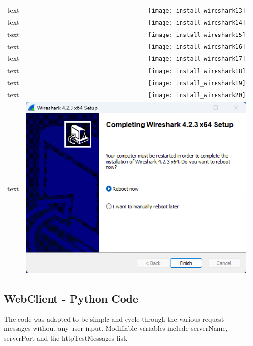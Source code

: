\documentclass[11pt,a4paper]{report}
\begin{document}
\begin{tabular}{ l r }
            text & \texttt{[image: install\_wireshark13]} \\
            text & \texttt{[image: install\_wireshark14]} \\
            text & \texttt{[image: install\_wireshark15]} \\
            text & \texttt{[image: install\_wireshark16]} \\
            text & \texttt{[image: install\_wireshark17]} \\
            text & \texttt{[image: install\_wireshark18]} \\
            text & \texttt{[image: install\_wireshark19]} \\
            text & \texttt{[image: install\_wireshark20]} \\
            text & \includegraphics[scale=0.3]{install_wireshark21} \\
        \end{tabular}

    \subsection{WebClient - Python Code}
        \lstset{style=pythoncode}
        
        The code was adapted to be simple and cycle through the various request messages without any user input.
        Modifiable variables include serverName, serverPort and the httpTestMessages list.

    
\end{document}

